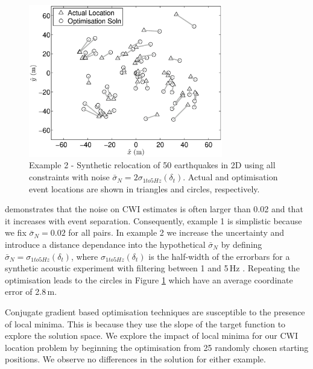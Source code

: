\documentclass[extra, onecolumn, doublespacing]{gji}
\begin{document}
\begin{figure}
\includegraphics[width = 20pc]{diags/locs_2D_50eq_3.eps}
\caption{Example 2 - Synthetic relocation of 50 earthquakes in 2D
using all constraints with noise $\bar{\sigma}_N= 2
\sigma_{1to5Hz}(\delta_t)$.
 Actual and optimisation event locations
are shown in triangles and circles, respectively.}
\label{fig-2D50eq-relocation_eg3}
\end{figure}
\citet{dr_Robinson11a} demonstrates that the noise on CWI estimates
is often larger than 0.02 and that it increases with event
separation. Consequently, example 1 is simplistic because we fix
$\bar{\sigma}_N=0.02$ for all pairs. In example 2 we increase the
uncertainty and introduce a distance dependance into the
hypothetical $\bar{\sigma}_N$ by defining
$\bar{\sigma}_N=\sigma_{1to5Hz}(\delta_t)$, where
$\sigma_{1to5Hz}(\delta_t)$ is the half-width of the errorbars for a
synthetic acoustic experiment with filtering between 1 and 5\,Hz
\citep[see Fig. 4(b) of ][]{dr_Robinson11a}. Repeating the
optimisation leads to the circles in Figure
\ref{fig-2D50eq-relocation_eg3} which have an average coordinate
error of 2.8\,m.

Conjugate gradient based optimisation techniques are susceptible to
the presence of local minima. This is because they use the slope of
the target function to explore the solution space. We explore the
impact of local minima for our CWI location problem by beginning the
optimisation from 25 randomly chosen starting positions. We observe
no differences in the solution for either example.
\end{document}
